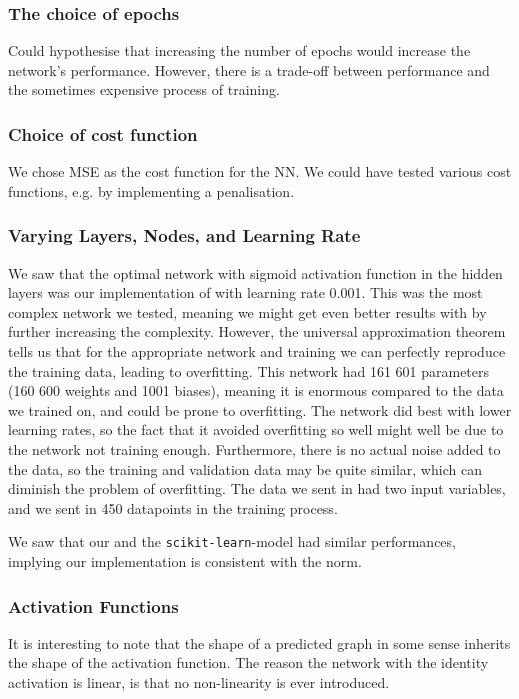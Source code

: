    \subsubsection{The choice of epochs}
        Could hypothesise that increasing the number of epochs would increase the network's performance. However, there is a trade-off between performance and the sometimes expensive process of training. 

    \subsubsection{Choice of cost function}
        We chose MSE as the cost function for the NN. We could have tested various cost functions, e.g. by implementing a penalisation. 

    \subsubsection{Varying Layers, Nodes, and Learning Rate}
        We saw that the optimal network with sigmoid activation function in the hidden layers was our implementation of  with learning rate 0.001. This was the most complex network we tested, meaning we might get even better results with by further increasing the complexity. However, the universal approximation theorem tells us that for the appropriate network and training we can perfectly reproduce the training data, leading to overfitting. This network had 161 601 parameters (160 600 weights and 1001 biases), meaning it is enormous compared to the data we trained on, and could be prone to overfitting. The network did best with lower learning rates, so the fact that it avoided overfitting so well might well be due to the network not training enough. Furthermore, there is no actual noise added to the data, so the training and validation data may be quite similar, which can diminish the problem of overfitting. The data we sent in had two input variables, and we sent in 450 datapoints in the training process.
        
        We saw that our and the \verb|scikit-learn|-model had similar performances, implying our implementation is consistent with the norm.


    \subsubsection{Activation Functions}
        It is interesting to note that the shape of a predicted graph in some sense inherits the shape of the activation function. The reason the network with the identity activation is linear, is that no non-linearity is ever introduced.

